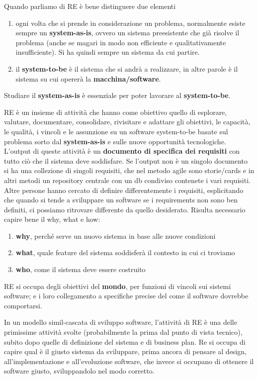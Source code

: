 Quando parliamo di RE è bene distinguere due elementi 
\begin{enumerate}
    \item ogni volta che si prende in considerazione un problema, normalmente esiste sempre un \textbf{system-as-is}, ovvero un sistema preesistente che già risolve il problema (anche se magari in modo non efficiente e qualitativamente insufficiente). Si ha quindi sempre un sistema da cui partire.
    \item il \textbf{system-to-be} è il sistema che si andrà a realizzare, in altre parole è il sistema su cui opererà la \textbf{macchina/software}.
\end{enumerate}
Studiare il \textbf{system-as-is} è essenziale per poter lavorare al \textbf{system-to-be}.

RE è un insieme di attività che hanno come obiettivo quello di esplorare, valutare, documentare, consolidare, rivisitare e adattare gli obiettivi, le capacità, le qualità, i vincoli e le assunzione su un software \textup{system-to-be} basate sul problema sorto dal \textbf{system-as-is } e sulle nuove opportunità tecnologiche.
L’output di queste attività è un \textbf{documento di specifica dei requisiti} con tutto ciò che il sistema deve soddisfare. Se l’output non è un singolo documento si ha una collezione di singoli requisiti, che nel metodo agile sono storie/cards e in altri metodi un repository centrale con un db condiviso contenete i vari requisiti. \\

Altre persone hanno cercato di definire differentemente i requisiti, esplicitando che quando si tende a sviluppare un software se i requirements non sono ben definiti, ci possiamo ritrovare differente da quello desiderato. Risulta necessario capire bene il why, what e how:
\begin{enumerate}
  \item \textbf{why}, perché serve un nuovo sistema in base alle nuove condizioni
  \item \textbf{what}, quale feature del sistema soddisferà il contesto in cui ci troviamo
  \item \textbf{who}, come il sistema deve essere costruito 
\end{enumerate}
RE si occupa degli obiettivi del \textbf{mondo}, per funzioni di vincoli sui sistemi software; e i loro collegamento a specifiche precise del come il software dovrebbe comportarsi. 

In un modello simil-cascata di sviluppo software, l'attività di RE è una delle primissime attività svolte (probabilmente la prima dal punto di vista tecnico), subito dopo quelle di definizione del sistema e di business plan. 
Re si occupa di capire qual è il giusto sistema da sviluppare, prima ancora di pensare al design, all’implementazione e all’evoluzione software, che invece si occupano di ottenere il software giusto, sviluppandolo nel modo corretto.

